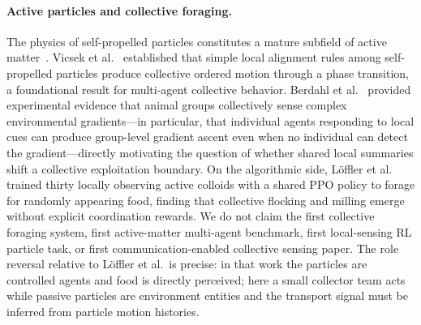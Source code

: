\documentclass{article}
\begin{document}
\paragraph{Active particles and collective foraging.}
The physics of self-propelled particles constitutes a mature subfield of
active matter~\cite{elgeti2015microswimmers}. Vicsek et al.~\cite{vicsek1995}
established that simple local alignment rules among self-propelled particles
produce collective ordered motion through a phase transition, a foundational
result for multi-agent collective behavior. Berdahl et al.~\cite{berdahl2013}
provided experimental evidence that animal groups collectively sense complex
environmental gradients---in particular, that individual agents responding to
local cues can produce group-level gradient ascent even when no individual can
detect the gradient---directly motivating the question of whether shared local
summaries shift a collective exploitation boundary.
On the algorithmic side, L\"offler et al.~\cite{loeffler2023foraging} trained
thirty locally observing active colloids with a shared PPO policy to forage for
randomly appearing food, finding that collective flocking and milling emerge
without explicit coordination rewards.
We do not claim the first collective foraging system, first active-matter
multi-agent benchmark, first local-sensing RL particle task, or first
communication-enabled collective sensing paper. The role reversal relative
to L\"offler et al.\ is precise: in that work the particles are controlled agents
and food is directly perceived; here a small collector team acts while passive
particles are environment entities and the transport signal must be inferred
from particle motion histories.
\end{document}
